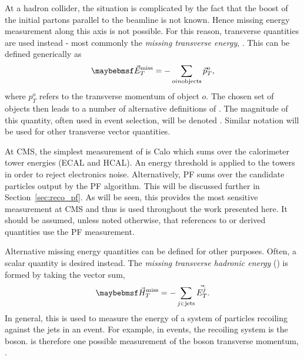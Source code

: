 At a hadron collider, the situation is complicated by the fact that the boost of
the initial partons parallel to the beamline is not known. Hence missing energy
measurement along this axis is not possible. For this reason, transverse
quantities are used instead - most commonly the \emph{missing transverse
  energy}, \METv. This can be defined generically as
\begin{equation*}
\METv = -\sum_{o in \textrm{objects}} \vec{p}_T^o,
\end{equation*}
where $p_T^o$ refers to the transverse momentum of object $o$. The chosen set of
objects then leads to a number of alternative definitions of \METv. The
magnitude of this quantity, often used in event selection, will be denoted
\MET. Similar notation will be used for other transverse vector quantities.

At \ac{CMS}, the simplest measurement of \METv is \ac{Calo} \METv which sums
over the calorimeter tower energies (\ac{ECAL} and \ac{HCAL}).  An energy
threshold is applied to the towers in order to reject electronics
noise. Alternatively, \ac{PF} \METv sums over the candidate particles output by
the \ac{PF} algorithm. This will be discussed further in
Section~\ref{sec:reco_pf}. As will be seen, this provides the most sensitive
\METv measurement at \ac{CMS} and thus is used throughout the work presented
here. It should be assumed, unless noted otherwise, that references to \METv or
derived quantities use the \ac{PF} measurement.

Alternative missing energy quantities can be defined for other purposes. Often,
a scalar quantity is desired instead. The \emph{missing transverse hadronic
  energy} (\MHT) is formed by taking the vector sum,
\begin{equation*}
\MHTv = -\sum_{j \in \textrm{jets}} \vec{E_T^j}.
\end{equation*}
In general, this is used to measure the energy of a system of particles
recoiling against the jets in an event. For example, in \Wjets events, the
recoiling system is the \PW boson. \MHTv is therefore one possible measurement
of the \PW boson transverse momentum, \PtWv.


